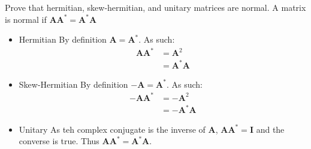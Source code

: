 Prove that hermitian, skew-hermitian, and unitary matrices are normal.
 A matrix is normal if $\boldsymbol{A}\boldsymbol{A}^*=\boldsymbol{A}^*\boldsymbol{A}$
 \begin{itemize}
 \item Hermitian
 By definition $\boldsymbol{A}=\boldsymbol{A}^*$. As such:
 \begin{equation*}
 	\begin{split}
 		\boldsymbol{A}\boldsymbol{A}^*&=\boldsymbol{A}^2\\
 		&=\boldsymbol{A}^*\boldsymbol{A}
	\end{split}
\end{equation*}
 \item Skew-Hermitian
  By definition $-\boldsymbol{A}=\boldsymbol{A}^*$. As such:
 \begin{equation*}
 	\begin{split}
 		-\boldsymbol{A}\boldsymbol{A}^*&=-\boldsymbol{A}^2\\
 		&=-\boldsymbol{A}^*\boldsymbol{A}
	\end{split}
\end{equation*}
 \item Unitary
 As teh complex conjugate is the inverse of $\boldsymbol{A}$, $\boldsymbol{A}\boldsymbol{A}^*=\boldsymbol{I}$ and the converse is true. Thus  $\boldsymbol{A}\boldsymbol{A}^*=\boldsymbol{A}^*\boldsymbol{A}$.
 	
 \end{itemize}


